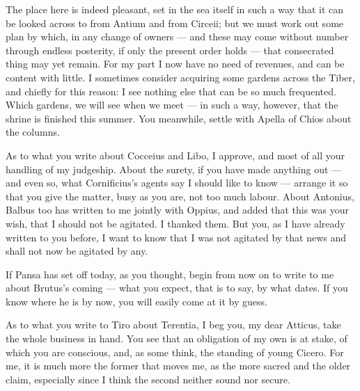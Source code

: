 

 The place here is indeed pleasant, set in the sea itself in such a way that it can be looked across to from Antium and from Circeii; but we must work out some plan by which, in any change of owners --- and these may come without number through endless posterity, if only the present order holds --- that consecrated thing may yet remain. For my part I now have no need of revenues, and can be content with little. I sometimes consider acquiring some gardens across the Tiber, and chiefly for this reason: I see nothing else that can be so much frequented. Which gardens, we will see when we meet --- in such a way, however, that the shrine is finished this summer. You meanwhile, settle with Apella of Chios about the columns.

 As to what you write about Cocceius and Libo, I approve, and most of all your handling of my judgeship. About the surety, if you have made anything out --- and even so, what Cornificius's agents say I should like to know --- arrange it so that you give the matter, busy as you are, not too much labour. About Antonius, Balbus too has written to me jointly with Oppius, and added that this was your wish, that I should not be agitated. I thanked them. But you, as I have already written to you before, I want to know that I was not agitated by that news and shall not now be agitated by any.

 If Pansa has set off today, as you thought, begin from now on to write to me about Brutus's coming --- what you expect, that is to say, by what dates. If you know where he is by now, you will easily come at it by guess.

 As to what you write to Tiro about Terentia, I beg you, my dear Atticus, take the whole business in hand. You see that an obligation of my own is at stake, of which you are conscious, and, as some think, the standing of young Cicero. For me, it is much more the former that moves me, as the more sacred and the older claim, especially since I think the second neither sound nor secure.
